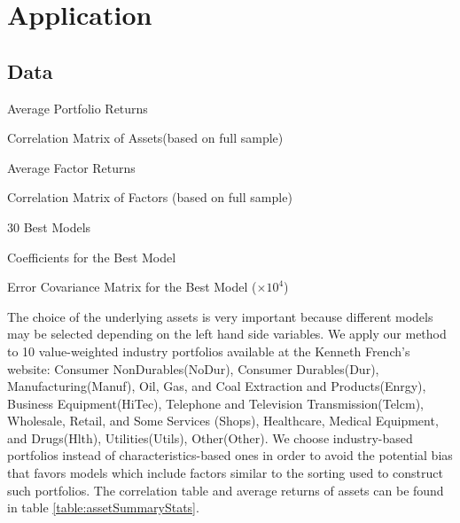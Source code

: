 \section{Application}
\subsection{Data}

\begin{sidewaystable}[ht]
	\centering
		
	\caption{Average Portfolio Returns}
	\bigskip\bigskip
	
	\caption{Correlation Matrix of Assets(based on full sample)}
	\label{table:assetSummaryStats}
\end{sidewaystable}

\begin{sidewaystable}[ht]
	\centering
	
	\caption{Average Factor Returns}
	\bigskip\bigskip
	
	\caption{Correlation Matrix of Factors (based on full sample)}
	\label{table:factorSummaryStats}
\end{sidewaystable}


\begin{sidewaystable}[ht]
	\centering
	
	\caption{30 Best Models}
	\label{table:bestModels}
\end{sidewaystable}

\begin{sidewaystable}[ht]
	\centering
	
	\caption{Coefficients for the Best Model}
	\bigskip\bigskip
	
	\caption{Error Covariance Matrix for the Best Model ($\times 10^4$)}
	\label{table:bestModel}
\end{sidewaystable}

The choice of the underlying assets is very important because  different models may be selected depending on the left hand side variables.
We apply our method to 10 value-weighted industry portfolios available at the Kenneth French's website: Consumer NonDurables(NoDur), Consumer Durables(Dur), Manufacturing(Manuf),  Oil, Gas, and Coal Extraction and Products(Enrgy), Business Equipment(HiTec),   Telephone and Television Transmission(Telcm),   Wholesale, Retail, and Some Services (Shops),
Healthcare, Medical Equipment, and Drugs(Hlth),
Utilities(Utils), Other(Other). 
We choose industry-based portfolios instead of characteristics-based ones in order to avoid the potential bias that favors models which include factors similar to the sorting used to construct such portfolios. 
The correlation table and average returns of assets can be found in table \ref{table:assetSummaryStats}.

